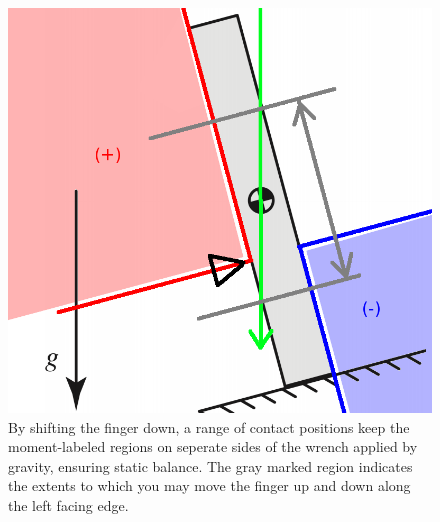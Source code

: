 \documentclass[letterpaper,10pt]{article} %
\begin{document}
\begin{figure}[h]
\centering
\includegraphics[width=\textwidth]{p4b}
\caption{By shifting the finger down, a range of contact positions keep the moment-labeled regions on seperate sides of the wrench applied by gravity, ensuring static balance. The gray marked region indicates the extents to which you may move the finger up and down along the left facing edge.}
\label{fig:p4b}
\end{figure}
\end{document}
